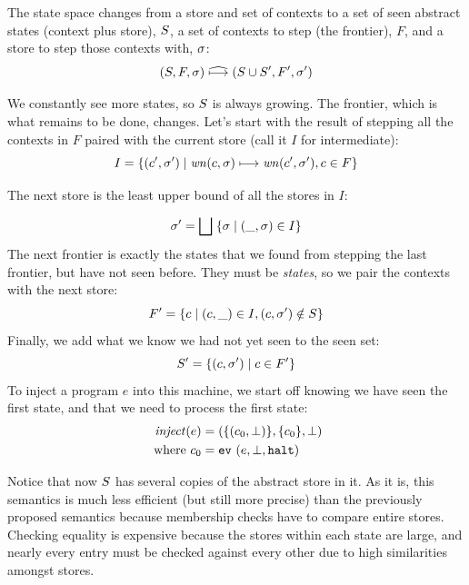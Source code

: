 \documentclass[9pt]{sigplanconf} %
\begin{document}
The state space changes from a store and set of contexts to a set of seen abstract states (context plus store), $S$, a set of contexts to step (the frontier), $F$, and a store to step those contexts with, $\sigma$:
\begin{equation*}
(S, F, \sigma) \mathrel{\widehat{\mathbin{\longmapsto}}} (S \cup S', F', \sigma')
\end{equation*}

We constantly see more states, so $S$ is always growing. The frontier,
which is what remains to be done, changes. Let's start with the result
of stepping all the contexts in $F$ paired with the current store (call it $I$ for intermediate):
%
\begin{equation*}
I = \{(c',\sigma') \mid \mathit{wn}(c, \sigma) \mathrel{\mathbin{\longmapsto}} \mathit{wn}(c', \sigma'), c \in F\}
\end{equation*}

The next store is the least upper bound of all the stores in $I$:

\begin{equation*}
\sigma' = \bigsqcup\; \{\sigma \mid (\_,\sigma) \in I\}
\end{equation*}
%
The next frontier is exactly the states that we found from stepping
the last frontier, but have not seen before. They must be
\emph{states}, so we pair the contexts with the next store:
%
\begin{equation*}
F' = \{c \mid (c,\_) \in I, (c,\sigma') \notin S\}
\end{equation*}
%
Finally, we add what we know we had not yet seen to the seen set:
\begin{equation*}
  S' = \{(c,\sigma') \mid c \in F'\}
\end{equation*}
%
To inject a program $e$ into this machine, we start off knowing we have seen the first state, and that we need to process the first state:
\begin{align*}
\mathit{inject}(e) &= (\{(c_0, \bot)\},\{c_0\},\bot) \\
\text{ where } c_0 &= {\tt ev}{\ }({e,\bot,{\tt halt}})
\end{align*}

Notice that now $S$ has several copies of the abstract store in it.
%
As it is, this semantics is much less efficient (but still more precise) than the previously proposed semantics because membership checks have to compare entire stores.
%
Checking equality is expensive because the stores within each state are large, and nearly every entry must be checked against every other due to high similarities amongst stores.
\end{document}
